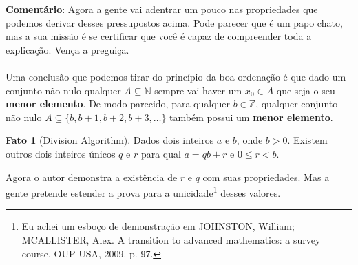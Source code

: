 \documentclass[a4paper,11pt,oneside]{book}
\theoremstyle{definition}
\theoremstyle{break}
\newtheorem{fact}{Fato}[section]
\begin{document}
\textbf{Comentário}: Agora a gente vai adentrar um pouco nas propriedades que podemos derivar desses pressupostos acima. Pode parecer que é um papo chato, mas a sua missão é se certificar que você é capaz de compreender toda a explicação. Vença a preguiça.
\\
\\
Uma conclusão que podemos tirar do princípio da boa ordenação é que dado um conjunto não nulo qualquer $A \subseteq \mathbb{N}$ sempre vai haver um $x_0 \in A$ que seja o seu \textbf{menor elemento}. De modo parecido, para qualquer $b \in \mathbb{Z}$, qualquer conjunto não nulo $A \subseteq \{ b, b+1, b+2, b+3, \dots \}$ também possui um \textbf{menor elemento}.

\begin{fact}[Division Algorithm]
Dados dois inteiros $a$ e $b$, onde $b > 0$. Existem outros dois inteiros únicos $q$ e $r$ para qual $a = qb + r$ e $0 \leq r < b$.
\end{fact}

Agora o autor demonstra a existência de $r$ e $q$ com suas propriedades. Mas a gente pretende estender a prova para a unicidade\footnote{Eu achei um esboço de demonstração em JOHNSTON, William; MCALLISTER, Alex. A transition to advanced mathematics: a survey course. OUP USA, 2009. p. 97.} desses valores.
\end{document}
